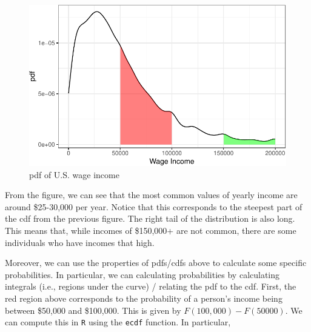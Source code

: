 \documentclass[
  letterpaper,
  DIV=11,
  numbers=noendperiod]{scrreprt}
\newenvironment{Shaded}{\begin{snugshade}}{\end{snugshade}}
\newcommand{\DecValTok}[1]{\textcolor[rgb]{0.68,0.00,0.00}{#1}}
\newcommand{\FunctionTok}[1]{\textcolor[rgb]{0.28,0.35,0.67}{#1}}
\newcommand{\NormalTok}[1]{\textcolor[rgb]{0.00,0.23,0.31}{#1}}
\newcommand{\OtherTok}[1]{\textcolor[rgb]{0.00,0.23,0.31}{#1}}
\newcommand{\SpecialCharTok}[1]{\textcolor[rgb]{0.37,0.37,0.37}{#1}}
\begin{document}
\begin{figure}[H]

{\centering \includegraphics{03-random_variables_files/figure-pdf/unnamed-chunk-6-1.pdf}

}

\caption{pdf of U.S. wage income}

\end{figure}%

From the figure, we can see that the most common values of yearly income
are around \$25-30,000 per year. Notice that this corresponds to the
steepest part of the cdf from the previous figure. The right tail of the
distribution is also long. This means that, while incomes of \$150,000+
are not common, there are some individuals who have incomes that high.

Moreover, we can use the properties of pdfs/cdfs above to calculate some
specific probabilities. In particular, we can calculating probabilities
by calculating integrals (i.e., regions under the curve) / relating the
pdf to the cdf. First, the red region above corresponds to the
probability of a person's income being between \$50,000 and \$100,000.
This is given by \(F(100,000) - F(50000)\). We can compute this in
\texttt{R} using the \texttt{ecdf} function. In particular,

\begin{Shaded}
\end{Shaded}
\end{document}
